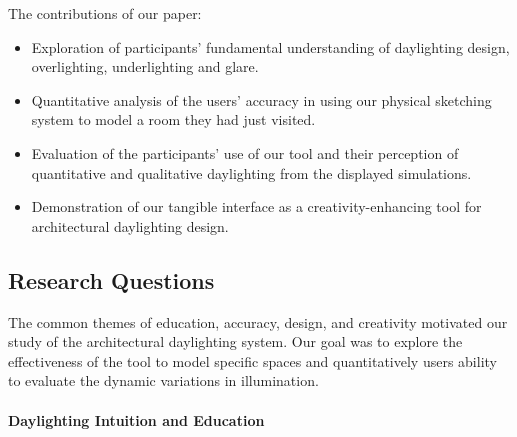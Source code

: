 \noindent
The contributions of our paper: \vspace{-0.05in}

\begin{itemize}

\item Exploration of participants' fundamental understanding of
  daylighting design, overlighting, underlighting and glare.

\item Quantitative analysis of the users' accuracy in using our
  physical sketching system to model a room they had just visited.

\item Evaluation of the participants' use of our tool and their
  perception of quantitative and qualitative daylighting from the 
  displayed simulations.

\item Demonstration of our tangible interface as a
  creativity-enhancing tool for architectural daylighting design.

\end{itemize}

\subsection{Research Questions}

The common themes of education, accuracy, design, and creativity
motivated our study of the architectural daylighting system.  Our goal
was to explore the effectiveness of the tool to model specific spaces
and quantitatively users ability to evaluate the dynamic variations in
illumination.  

%

\paragraph{Daylighting Intuition and Education}

